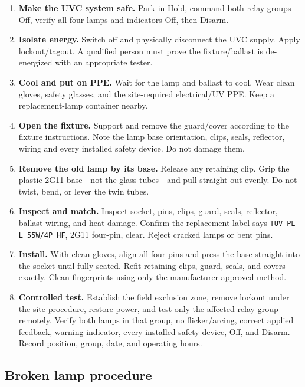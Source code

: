 \documentclass[
  10pt,
  letterpaper,
  openany]{report}
\providecommand{\tightlist}{%
  \setlength{\itemsep}{0pt}\setlength{\parskip}{0pt}}
\begin{document}
\begin{enumerate}
\tightlist
\item
  \textbf{Make the UVC system safe.} Park in Hold, command both relay
  groups Off, verify all four lamps and indicators Off, then Disarm.
\item
  \textbf{Isolate energy.} Switch off and physically disconnect the UVC
  supply. Apply lockout/tagout. A qualified person must prove the
  fixture/ballast is de-energized with an appropriate tester.
\item
  \textbf{Cool and put on PPE.} Wait for the lamp and ballast to cool.
  Wear clean gloves, safety glasses, and the site-required electrical/UV
  PPE. Keep a replacement-lamp container nearby.
\item
  \textbf{Open the fixture.} Support and remove the guard/cover
  according to the fixture instructions. Note the lamp base orientation,
  clips, seals, reflector, wiring and every installed safety device. Do
  not damage them.
\item
  \textbf{Remove the old lamp by its base.} Release any retaining clip.
  Grip the plastic 2G11 base---not the glass tubes---and pull straight
  out evenly. Do not twist, bend, or lever the twin tubes.
\item
  \textbf{Inspect and match.} Inspect socket, pins, clips, guard, seals,
  reflector, ballast wiring, and heat damage. Confirm the replacement
  label says \texttt{TUV\ PL-L\ 55W/4P\ HF}, 2G11 four-pin, clear.
  Reject cracked lamps or bent pins.
\item
  \textbf{Install.} With clean gloves, align all four pins and press the
  base straight into the socket until fully seated. Refit retaining
  clips, guard, seals, and covers exactly. Clean fingerprints using only
  the manufacturer-approved method.
\item
  \textbf{Controlled test.} Establish the field exclusion zone, remove
  lockout under the site procedure, restore power, and test only the
  affected relay group remotely. Verify both lamps in that group, no
  flicker/arcing, correct applied feedback, warning indicator, every
  installed safety device, Off, and Disarm. Record position, group,
  date, and operating hours.
\end{enumerate}

\subsection{Broken lamp procedure}\label{broken-lamp-procedure}
\end{document}
